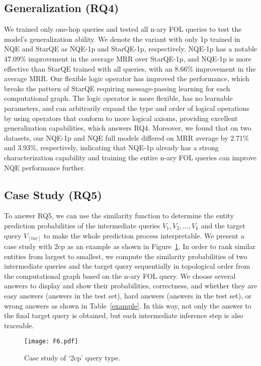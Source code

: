 \documentclass[letterpaper]{article} \usepackage{aaai23}  \usepackage{times}  \usepackage{helvet}  \usepackage{courier}  \usepackage[hyphens]{url}  \usepackage{graphicx} \urlstyle{rm} \def\UrlFont{\rm}  \usepackage{natbib}  \usepackage{caption} \frenchspacing  \setlength{\pdfpagewidth}{8.5in}  \setlength{\pdfpageheight}{11in}  \usepackage{algorithm}
\begin{document}
\subsection{Generalization (RQ4)} 
We trained only one-hop queries and tested all n-ary FOL queries to test the model's generalization ability. We denote the variant with only 1p trained in NQE and StarQE as NQE-1p and StarQE-1p, respectively. NQE-1p has a notable 47.09\% improvement in the average MRR over StarQE-1p, and NQE-1p is more effective than StarQE trained with all queries, with an 8.66\% improvement in the average MRR. Our flexible logic operator has improved the performance, which breaks the pattern of StarQE requiring message-passing learning for each computational graph. The logic operator is more flexible, has no learnable parameters, and can arbitrarily expand the type and order of logical operations by using operators that conform to more logical axioms, providing excellent generalization capabilities, which answers RQ4. Moreover, we found that on two datasets, our NQE-1p and NQE full models differed on MRR average by 2.71\% and 3.93\%, respectively, indicating that NQE-1p already has a strong characterization capability and training the entire n-ary FOL queries can improve NQE performance further.


\subsection{Case Study (RQ5)} 
To answer RQ5, we can use the similarity function to determine the entity prediction probabilities of the intermediate queries $V_1, V_2,\ldots, V_k$ and the target query $V_{[tar]}$ to make the whole prediction process interpretable. We present a case study with 2cp as an example as shown in Figure~\ref{f6}. In order to rank similar entities from largest to smallest, we compute the similarity probabilities of two intermediate queries and the target query sequentially in topological order from the computational graph based on the n-ary FOL query. We choose several answers to display and show their probabilities, correctness, and whether they are easy answers (answers in the test set), hard answers (answers in the test set), or wrong answers as shown in Table~\ref{example}. In this way, not only the answer to the final target query is obtained, but each intermediate inference step is also traceable.

\begin{figure}[t]
\centering
\texttt{[image: F6.pdf]}
\caption{Case study of `2cp' query type.}
\label{f6}
\end{figure}
\end{document}
